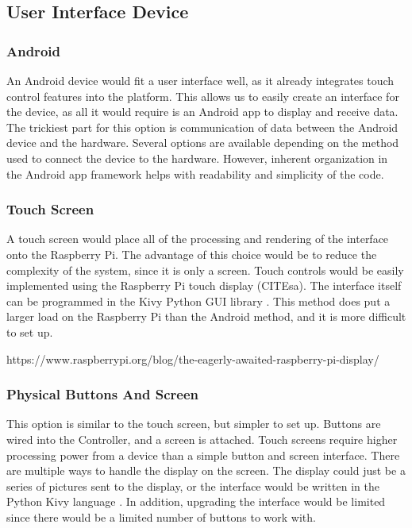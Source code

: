 \documentclass[draftclsnofoot,onecolumn,letterpaper,10pt]{IEEEtran}
\begin{document}
\subsection{User Interface Device}

\subsubsection{Android}
An Android device would fit a user interface well, as it already integrates touch control features into the platform.
This allows us to easily create an interface for the device, as all it would require is an Android app to display and receive data.
The trickiest part for this option is communication of data between the Android device and the hardware.
Several options are available depending on the method used to connect the device to the hardware.
However, inherent organization in the Android app framework helps with readability and simplicity of the code.

\subsubsection{Touch Screen}
A touch screen would place all of the processing and rendering of the interface onto the Raspberry Pi.
The advantage of this choice would be to reduce the complexity of the system, since it is only a screen.
Touch controls would be easily implemented using the Raspberry Pi touch display (CITEsa).
The interface itself can be programmed in the Kivy Python GUI library \cite{Kivy}.
This method does put a larger load on the Raspberry Pi than the Android method, and it is more difficult to set up.

https://www.raspberrypi.org/blog/the-eagerly-awaited-raspberry-pi-display/ 

\subsubsection{Physical Buttons And Screen}
This option is similar to the touch screen, but simpler to set up.
Buttons are wired into the Controller, and a screen is attached.
Touch screens require higher processing power from a device than a simple button and screen interface.
There are multiple ways to handle the display on the screen.
The display could just be a series of pictures sent to the display, or the interface would be written in the Python Kivy language \cite{Kivy}.
In addition, upgrading the interface would be limited since there would be a limited number of buttons to work with.
\end{document}
